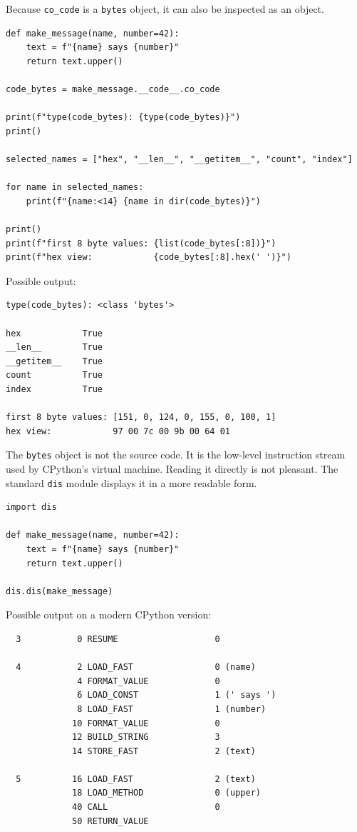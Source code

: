 Because \texttt{co\_code} is a \texttt{bytes} object, it can also be inspected as an object.

\begin{verbatim}
def make_message(name, number=42):
    text = f"{name} says {number}"
    return text.upper()

code_bytes = make_message.__code__.co_code

print(f"type(code_bytes): {type(code_bytes)}")
print()

selected_names = ["hex", "__len__", "__getitem__", "count", "index"]

for name in selected_names:
    print(f"{name:<14} {name in dir(code_bytes)}")

print()
print(f"first 8 byte values: {list(code_bytes[:8])}")
print(f"hex view:            {code_bytes[:8].hex(' ')}")
\end{verbatim}

Possible output:

\begin{verbatim}
type(code_bytes): <class 'bytes'>

hex            True
__len__        True
__getitem__    True
count          True
index          True

first 8 byte values: [151, 0, 124, 0, 155, 0, 100, 1]
hex view:            97 00 7c 00 9b 00 64 01
\end{verbatim}

The \texttt{bytes} object is not the source code. It is the low-level instruction stream used by CPython's virtual machine. Reading it directly is not pleasant. The standard \texttt{dis} module displays it in a more readable form.

\begin{verbatim}
import dis

def make_message(name, number=42):
    text = f"{name} says {number}"
    return text.upper()

dis.dis(make_message)
\end{verbatim}

Possible output on a modern CPython version:

\begin{verbatim}
  3           0 RESUME                   0

  4           2 LOAD_FAST                0 (name)
              4 FORMAT_VALUE             0
              6 LOAD_CONST               1 (' says ')
              8 LOAD_FAST                1 (number)
             10 FORMAT_VALUE             0
             12 BUILD_STRING             3
             14 STORE_FAST               2 (text)

  5          16 LOAD_FAST                2 (text)
             18 LOAD_METHOD              0 (upper)
             40 CALL                     0
             50 RETURN_VALUE
\end{verbatim}

